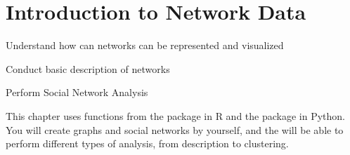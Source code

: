 \chapter{Introduction to Network Data}
\label{chap:network}

\begin{abstract}{Abstract}
  
Specially social media data, but also other types of data can often be represented as networks.This chapter introduces  (R+Python) and  (Python) to showcase how to deal with such data and perform Social Network Analysis (SNA). 
\end{abstract}


\begin{objectives}
\item Understand how can networks can be represented and visualized
\item Conduct basic description of networks
\item Perform Social Network Analysis
\end{objectives}

\begin{feature}
This chapter uses functions from the package  in R and the package  in Python. You will create graphs and social networks by yourself, and the will be able to perform different types of analysis, from description to clustering.
\end{feature}



